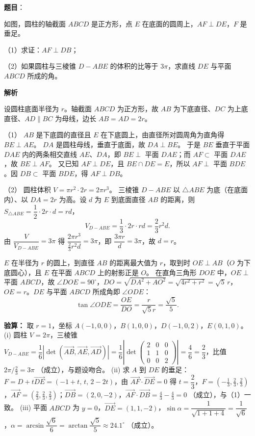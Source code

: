 \begin{answer}

\textbf{题目}：

如图，圆柱的轴截面 $ABCD$ 是正方形，点 $E$ 在底面的圆周上，$AF\perp DE$，$F$ 是垂足。
\nopagebreak[4]
\begin{center}\end{center}
\nopagebreak[4]
（1）求证：$AF\perp DB$；

（2）如果圆柱与三棱锥 $D-ABE$ 的体积的比等于 $3\pi$，求直线 $DE$ 与平面 $ABCD$ 所成的角。

\textbf{解析}

设圆柱底面半径为 $r$。轴截面 $ABCD$ 为正方形，故 $AB$ 为下底直径、$DC$ 为上底直径、$AD\parallel BC$ 为母线，边长 $AB=AD=2r$。

（1） $AB$ 是下底圆的直径且 $E$ 在下底圆上，由直径所对圆周角为直角得 $BE\perp AE$。
$DA$ 是圆柱母线，垂直于底面，故 $DA\perp BE$。
于是 $BE$ 垂直于平面 $DAE$ 内的两条相交直线 $AE$、$DA$，即 $BE\perp$ 平面 $DAE$；而 $AF\subset$ 平面 $DAE$，故 $BE\perp AF$。
又已知 $AF\perp DE$，且 $BE\cap DE=E$，所以 $AF\perp$ 平面 $BDE$。因 $DB\subset$ 平面 $BDE$，得 $AF\perp DB$。

（2） 圆柱体积 $V=\pi r^2\cdot 2r=2\pi r^3$。
三棱锥 $D-ABE$ 以 $\triangle ABE$ 为底（在底面内）、以 $DA=2r$ 为高。设 $d$ 为 $E$ 到底面直径 $AB$ 的距离，则 $S_{\triangle ABE}=\dfrac12\cdot 2r\cdot d=rd$，
\nopagebreak[4]
\[V_{D-ABE}=\frac13\cdot 2r\cdot rd=\frac23r^2d.\]
由 $\dfrac{V}{V_{D-ABE}}=3\pi$ 得 $\dfrac{2\pi r^3}{\frac23 r^2 d}=3\pi$，即 $\dfrac{3\pi r}{d}=3\pi$，故 $d=r$。

$E$ 在半径为 $r$ 的圆上，到直径 $AB$ 的距离最大值为 $r$，取到时 $OE\perp AB$（$O$ 为下底圆心），且 $E$ 在平面 $ABCD$ 上的射影正是 $O$。
在直角三角形 $DOE$ 中，$OE\perp$ 平面 $ABCD$，故 $\angle DOE=90^\circ$，$DO=\sqrt{DA^2+AO^2}=\sqrt{4r^2+r^2}=\sqrt5\,r$，$OE=r$。$DE$ 与平面 $ABCD$ 所成角即 $\angle ODE$：
\nopagebreak[4]
\[\tan\angle ODE=\frac{OE}{DO}=\frac{r}{\sqrt5 r}=\frac{\sqrt5}{5}.\]

\textbf{验算：} 取 $r=1$，坐标 $A(-1,0,0)$，$B(1,0,0)$，$D(-1,0,2)$，$E(0,1,0)$。
(i) 圆柱 $V=2\pi$，三棱锥 $V_{D-ABE}=\dfrac16\left|\det(\overrightarrow{AB},\overrightarrow{AE},\overrightarrow{AD})\right|=\dfrac16\left|\det\begin{pmatrix}2&0&0\\1&1&0\\0&0&2\end{pmatrix}\right|=\dfrac{4}{6}=\dfrac23$，比值 $2\pi/\frac23=3\pi$ （成立），与题设吻合。
(ii) 求 $A$ 到 $DE$ 的垂足：$F=D+t\overrightarrow{DE}=(-1+t,\,t,\,2-2t)$，由 $\overrightarrow{AF}\cdot\overrightarrow{DE}=0$ 得 $t=\dfrac23$，$F=\left(-\tfrac13,\tfrac23,\tfrac23\right)$，$\overrightarrow{AF}=\left(\tfrac23,\tfrac23,\tfrac23\right)$；$\overrightarrow{DB}=(2,0,-2)$，$\overrightarrow{AF}\cdot\overrightarrow{DB}=\tfrac43-\tfrac43=0$ （成立），与（1）一致。
(iii) 平面 $ABCD$ 为 $y=0$，$\overrightarrow{DE}=(1,1,-2)$，$\sin\alpha=\dfrac{1}{\sqrt{1+1+4}}=\dfrac{1}{\sqrt6}$，$\alpha=\arcsin\dfrac{\sqrt6}{6}=\arctan\dfrac{\sqrt5}{5}\approx24.1^\circ$ （成立）。


\end{answer}
